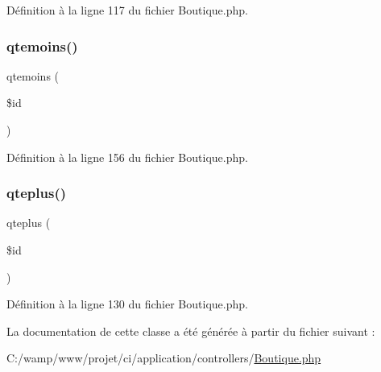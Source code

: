 Définition à la ligne 117 du fichier Boutique.\+php.

\mbox{\label{class_boutique_ae286f28e37e1f03df804ad80e32dbe85}} 
\subsubsection{\texorpdfstring{qtemoins()}{qtemoins()}}
{\footnotesize\ttfamily qtemoins (\begin{DoxyParamCaption}\item[{}]{\$id }\end{DoxyParamCaption})}



Définition à la ligne 156 du fichier Boutique.\+php.

\mbox{\label{class_boutique_aba493c15d991bb9fb45402c45c019a0a}} 
\subsubsection{\texorpdfstring{qteplus()}{qteplus()}}
{\footnotesize\ttfamily qteplus (\begin{DoxyParamCaption}\item[{}]{\$id }\end{DoxyParamCaption})}



Définition à la ligne 130 du fichier Boutique.\+php.



La documentation de cette classe a été générée à partir du fichier suivant \+:\begin{DoxyCompactItemize}
\item 
C\+:/wamp/www/projet/ci/application/controllers/\mbox{\hyperlink{_boutique_8php}{Boutique.\+php}}\end{DoxyCompactItemize}
